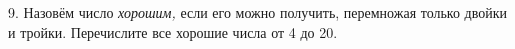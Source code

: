 9. Назовём число {\it хорошим,} если его можно получить, перемножая только двойки и тройки. Перечислите все хорошие числа от 4 до 20.\\
